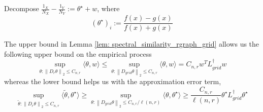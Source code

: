 \documentclass{article}
\newcommand{\norm}[1]{\left\lVert#1\right\rVert}
\newcommand{\dotp}[2]{\langle #1, #2 \rangle}
\newcommand{\1}{\mathbb{I}}
\newcommand{\Linv}{L^{\dagger}}
\theoremstyle{alden}
\theoremstyle{aldenthm}
\theoremstyle{definition}
\theoremstyle{remark}
\begin{document}
Decompose $\frac{1_X}{N_X} - \frac{1_Y}{N_Y} := \theta^{\star} + w$, where
\begin{equation*}
(\theta^{\star})_i := \frac{f(x) - g(x)}{f(x) + g(x)}
\end{equation*}

The upper bound in Lemma \ref{lem: spectral_similarity_rgraph_grid} allows us the following upper bound on the empirical process
\begin{equation*}
\sup_{\theta: \norm{D_{r}\theta}_2 \leq C_{n,r}} \dotp{\theta}{w} \leq  \sup_{\theta: \norm{D_{grid}\theta}_2 \leq C_{n,r}} \dotp{\theta}{w} = C_{n,r} w^T{\Linv_{grid}}w 
\end{equation*}
whereas the lower bound helps us with the approximation error term,
\begin{equation*}
\sup_{\widetilde{\theta}: \norm{D_{r}\theta}_2 \leq C_{n,r}} \dotp{\widetilde{\theta}}{\theta^{\star}} \geq \sup_{\theta: \norm{D_{grid}\theta}_2 \leq C_{n,r}/ \ell(n,r)} \dotp{\theta}{\theta^{\star}} \geq \frac{C_{n,r}}{\ell(n,r)} \theta^{\star}\Linv_{grid} \theta^{\star}
\end{equation*}
\end{document}
